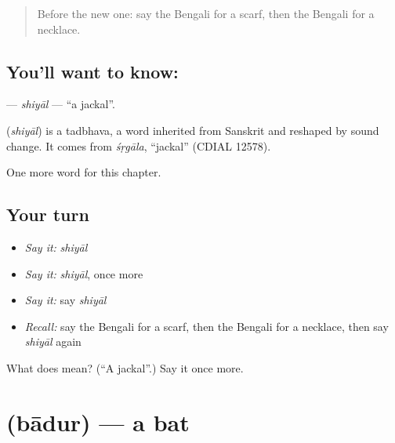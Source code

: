 \label{lesson:BN-C120-shiyal}



\begin{quote}
Before the new one: say the Bengali for a scarf, then the Bengali for a necklace.
\end{quote}

\subsection*{You'll want to know: }
\textbf{} — \emph{shiyāl} — \textquotedblleft{}a jackal\textquotedblright{}.

\begin{cousinweb}
\textbf{} (\emph{shiyāl}) is a tadbhava, a word inherited from Sanskrit and reshaped by sound change. It comes from \emph{śṛgāla}, \textquotedblleft{}jackal\textquotedblright{} (CDIAL 12578).
\end{cousinweb}

\begin{grammarlens}[title={What you've built}]
One more word for this chapter.
\end{grammarlens}

\subsection*{Your turn}
\begin{itemize}
\raggedright
  \item \emph{Say it:} \emph{shiyāl}
  \item \emph{Say it:} \emph{shiyāl}, once more
  \item \emph{Say it:} say \emph{shiyāl}
  \item \emph{Recall:} say the Bengali for a scarf, then the Bengali for a necklace, then say \emph{shiyāl} again
\end{itemize}

\begin{tcolorbox}[breakable,colback=teal!4,colframe=teal!35!black,title={Before you move on}]
What does  mean? (\textquotedblleft{}A jackal\textquotedblright{}.) Say it once more.
\end{tcolorbox}
\section[\texorpdfstring{\bn{বাদুড়} (bādur)}{বাদুড় (bādur)}]{ (bādur) — a bat}

\label{lesson:BN-C120-badur}



